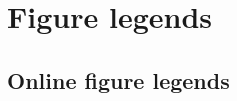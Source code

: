 \documentclass[11pt]{article}
\begin{document}
\newpage{}

\section*{Figure legends}





\renewcommand{\figurename}{Video} 
\setcounter{figure}{0}


\renewcommand{\figurename}{Figure}
\setcounter{figure}{1}




\subsection*{Online figure legends}
\end{document}
